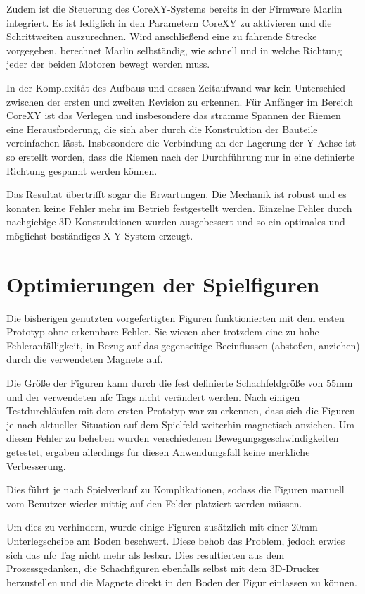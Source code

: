 Zudem ist die Steuerung des CoreXY-Systems bereits in der Firmware
Marlin integriert. Es ist lediglich in den Parametern CoreXY zu
aktivieren und die Schrittweiten auszurechnen. Wird anschließend eine zu
fahrende Strecke vorgegeben, berechnet Marlin selbständig, wie schnell
und in welche Richtung jeder der beiden Motoren bewegt werden muss.

In der Komplexität des Aufbaus und dessen Zeitaufwand war kein
Unterschied zwischen der ersten und zweiten Revision zu erkennen. Für
Anfänger im Bereich CoreXY ist das Verlegen und insbesondere das stramme
Spannen der Riemen eine Herausforderung, die sich aber durch die
Konstruktion der Bauteile vereinfachen lässt. Insbesondere die
Verbindung an der Lagerung der Y-Achse ist so erstellt worden, dass die
Riemen nach der Durchführung nur in eine definierte Richtung gespannt
werden können.

Das Resultat übertrifft sogar die Erwartungen. Die Mechanik ist robust
und es konnten keine Fehler mehr im Betrieb festgestellt werden.
Einzelne Fehler durch nachgiebige 3D-Konstruktionen wurden ausgebessert
und so ein optimales und möglichst beständiges X-Y-System erzeugt.

\hypertarget{optimierungen-der-spielfiguren}{%
\section{Optimierungen der
Spielfiguren}\label{optimierungen-der-spielfiguren}}

Die bisherigen genutzten vorgefertigten Figuren funktionierten mit dem
ersten Prototyp ohne erkennbare Fehler. Sie wiesen aber trotzdem eine zu
hohe Fehleranfälligkeit, in Bezug auf das gegenseitige Beeinflussen
(abstoßen, anziehen) durch die verwendeten Magnete auf.

Die Größe der Figuren kann durch die fest definierte Schachfeldgröße von
55mm und der verwendeten \gls{nfc} Tags nicht verändert werden. Nach
einigen Testdurchläufen mit dem ersten Prototyp war zu erkennen, dass
sich die Figuren je nach aktueller Situation auf dem Spielfeld weiterhin
magnetisch anziehen. Um diesen Fehler zu beheben wurden verschiedenen
Bewegungsgeschwindigkeiten getestet, ergaben allerdings für diesen
Anwendungsfall keine merkliche Verbesserung.

Dies führt je nach Spielverlauf zu Komplikationen, sodass die Figuren
manuell vom Benutzer wieder mittig auf den Felder platziert werden
müssen.

Um dies zu verhindern, wurde einige Figuren zusätzlich mit einer 20mm
Unterlegscheibe am Boden beschwert. Diese behob das Problem, jedoch
erwies sich das \gls{nfc} Tag nicht mehr als lesbar. Dies resultierten
aus dem Prozessgedanken, die Schachfiguren ebenfalls selbst mit dem
3D-Drucker herzustellen und die Magnete direkt in den Boden der Figur
einlassen zu können.

